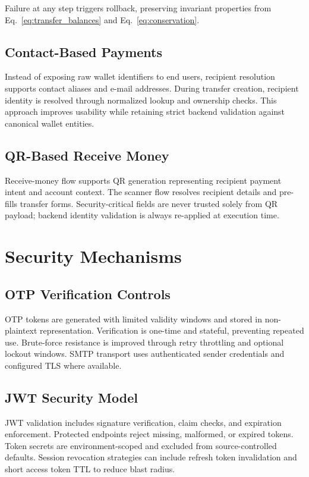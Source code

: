 \documentclass[conference]{IEEEtran}
\begin{document}
Failure at any step triggers rollback, preserving invariant properties from Eq.~\ref{eq:transfer_balances} and Eq.~\ref{eq:conservation}.

\subsection{Contact-Based Payments}
Instead of exposing raw wallet identifiers to end users, recipient resolution supports contact aliases and e-mail addresses. During transfer creation, recipient identity is resolved through normalized lookup and ownership checks. This approach improves usability while retaining strict backend validation against canonical wallet entities.

\subsection{QR-Based Receive Money}
Receive-money flow supports QR generation representing recipient payment intent and account context. The scanner flow resolves recipient details and pre-fills transfer forms. Security-critical fields are never trusted solely from QR payload; backend identity validation is always re-applied at execution time.

\section{Security Mechanisms}
\subsection{OTP Verification Controls}
OTP tokens are generated with limited validity windows and stored in non-plaintext representation. Verification is one-time and stateful, preventing repeated use. Brute-force resistance is improved through retry throttling and optional lockout windows. SMTP transport uses authenticated sender credentials and configured TLS where available.

\subsection{JWT Security Model}
JWT validation includes signature verification, claim checks, and expiration enforcement. Protected endpoints reject missing, malformed, or expired tokens. Token secrets are environment-scoped and excluded from source-controlled defaults. Session revocation strategies can include refresh token invalidation and short access token TTL to reduce blast radius.
\end{document}
